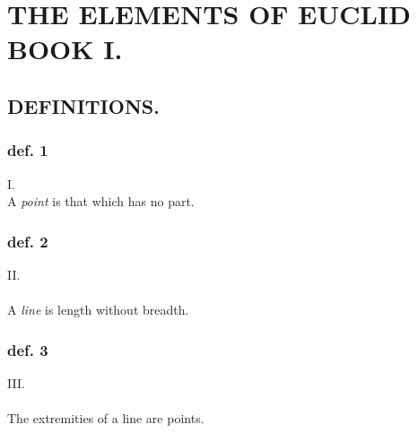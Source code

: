 \pagestyle{fancy}
\fancyhf{}
\renewcommand{\headrulewidth}{0pt}
%

\begin{minipage}{0.33\textwidth}
    \phantom{}
\end{minipage}
\begin{minipage}{0.67\textwidth}
    \null\removelastskip\nointerlineskip\vspace*{-\baselineskip}
    \section[Book I]{\centering THE ELEMENTS OF EUCLID\\ BOOK I.}
    \label{sec:book1}

    \hfill

    \subsection[Definitions]{\centering \scshape{\LARGE{DEFINITIONS.}}}
    \label{subsec:definitions}

    \hfill

    \subsubsection{def. 1}
    \begin{center}
        I.\label{book1def1}
        \hfill\\
        A \textit{point} is that which has no part.\\
    \end{center}
    \subsubsection{def. 2}
    \begin{center}
        II.\label{book1def2}\\
        \hfill\\
        A \textit{line} is length without breadth.\\
    \end{center}
    \subsubsection{def. 3}
    \begin{center}
        III.\label{book1def3}\\
        \hfill\\
        The extremities of a line are points.\\
    \end{center}

\end{minipage}
